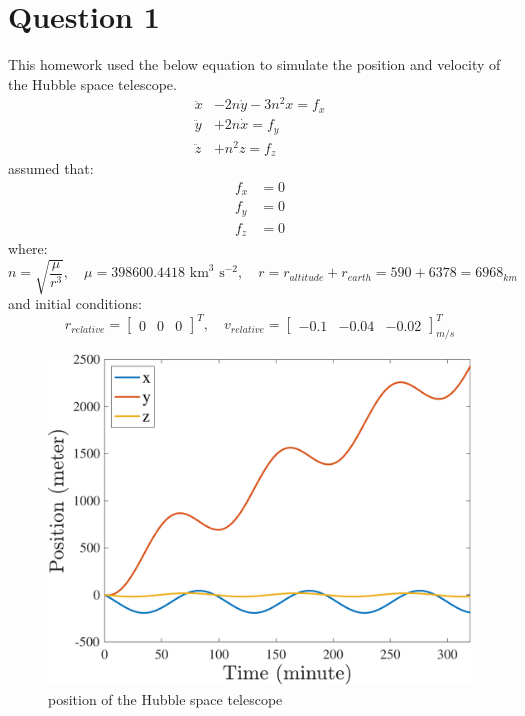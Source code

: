 \section{Question 1}
This homework used the below equation to simulate the position and velocity of the Hubble space telescope.
\begin{align*}
    \ddot x& - 2n\dot y -3n^2x = f_x \\
    \ddot y& + 2n\dot x = f_y \\
    \ddot z& + n^2z= f_z
\end{align*}
assumed that:
\begin{align*}
    f_x& = 0 \\
    f_y& = 0 \\
    f_z& = 0
\end{align*}
where:
\begin{equation*}
    n = \sqrt{\dfrac{\mu}{r^3}}, \quad \mu = 398600.4418 \text{ km}^3 \text{ s}^{-2}, \quad r = r_{altitude} + r_{earth} = 590 + 6378 = 6968_{km}
\end{equation*}
and initial conditions:
$$
r_{relative} = 
\begin{bmatrix}
    0 & 0 & 0
\end{bmatrix}^{T}, \quad v_{relative} = \begin{bmatrix}
    -0.1 & -0.04 & -0.02
\end{bmatrix}_{m/s}^{T}
$$

\begin{figure}[H]
    \caption{position of the Hubble space telescope}
    \centering
    \includegraphics[width=12cm]{../Figure/Q1/position}
\end{figure}

